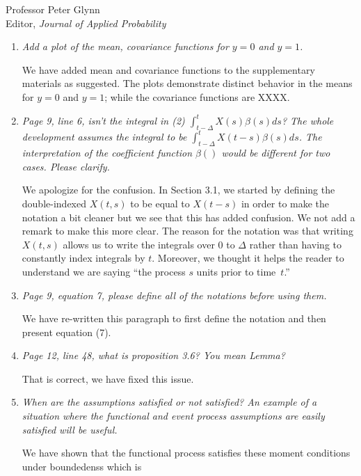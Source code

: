 \documentclass[11pt]{letter} %
\begin{document}
\begin{letter}{Professor
	Peter Glynn\\
	Editor, {\em Journal of Applied Probability}}
\begin{enumerate}
\item {\it Add a plot of the mean, covariance functions for $y=0$ and $y=1$.}

\vspace{5mm}
We have added mean and covariance functions to the supplementary materials as suggested.  The plots demonstrate distinct behavior in the means for $y=0$ and $y=1$; while the covariance functions are XXXX.
\vspace{5mm}

\item {\it Page 9, line 6, isn’t the integral in (2) $\int_{t-\Delta}^t X(s) \beta(s)ds$? The whole development assumes the integral to be $\int_{t-\Delta}^t X(t-s) \beta(s)ds$. The interpretation of the coefficient function $\beta()$ would be different for two cases. Please clarify.}

\vspace{5mm}
We apologize for the confusion.  In Section 3.1, we started by defining the double-indexed $X(t,s)$ to be equal to $X(t-s)$ in order to make the notation a bit cleaner but we see that this has added confusion.  We not add a remark to make this more clear.  The reason for the notation was that writing $X(t,s)$ allows us to write the integrals over $0$ to $\Delta$ rather than having to constantly index integrals by $t$.  Moreover, we thought it helps the reader to understand we are saying ``the process $s$ units prior to time~$t$.''
\vspace{5mm}

\item {\it Page 9, equation 7, please define all of the notations before using them.}

\vspace{5mm}
We have re-written this paragraph to first define the notation and then present equation (7).
\vspace{5mm}

\item {\it Page 12, line 48, what is proposition 3.6? You mean Lemma?}

\vspace{5mm}
That is correct, we have fixed this issue.
\vspace{5mm}

\item {\it When are the assumptions satisfied or not satisfied? An example of a
situation where the functional and event process assumptions are easily satisfied will be useful.}

\vspace{5mm}
We have shown that the functional process satisfies these moment conditions under boundedenss which is
\vspace{5mm}


\end{enumerate}
\end{letter}
\end{document}
